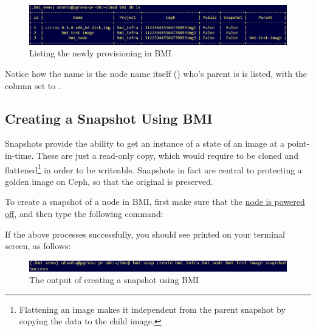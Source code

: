 \begin{figure}[!h] %
\label{fig:bmi-workflow}
\begin{center}
\includegraphics[scale=0.7]{figures/bmi-provisioning-db-ls.png}
\end{center}
\caption{Listing the newly provisioning in BMI}
\end{figure}


Notice how the name is the node name itself () who's parent is  is listed, with the  column set to .   \\


\subsection{Creating a Snapshot Using BMI}

Snapshots provide the ability to get an instance of a state of an image at a point-in-time.  These are just a read-only copy, which would require to be cloned and flattened\footnote{Flattening an image makes it independent from the parent snapshot by copying the data to the child image.} in order to be writeable.   Snapshots in fact are central to protecting a golden image on Ceph, so that the original is preserved. \\

\pagebreak

To create a snapshot of a node in BMI, first make sure that the \underline{node is powered off}, and then type the following command: 



If the above processes successfully, you should see  printed on your terminal screen, as follows: \\


\begin{figure}[!h] %
\label{fig:bmi-workflow}
\begin{center}
\includegraphics[scale=0.7]{figures/bmi-snapshot-create.png}
\end{center}
\caption{The output of creating a snapshot using BMI}
\end{figure}



